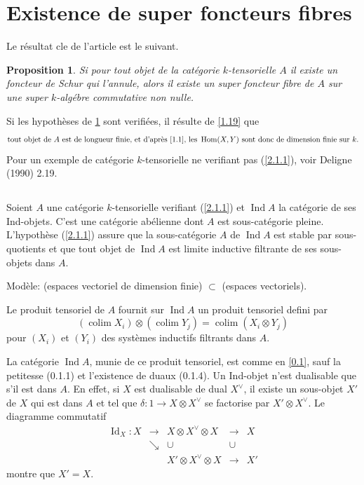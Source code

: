 \documentclass[11pt,a4paper]{article}
\theoremstyle{plain}
\newtheorem{proposition}[theorem]{Proposition}
\theoremstyle{definition}
\DeclareMathOperator{\Hom}{Hom}
\DeclareMathOperator{\Ind}{Ind}
\DeclareMathOperator{\Id}{Id}
\DeclareMathOperator*{\colim}{colim}
\begin{document}
\section{Existence de super foncteurs fibres}\label{2}

Le r\'esultat cle de l'article est le suivant.

\begin{proposition}\label{2.1}
Si pour tout objet de la cat\'egorie $k$-tensorielle $A$ il existe un foncteur de Schur qui l'annule, alors il existe un super foncteur fibre de $A$ sur une super $k$-alg\'ebre commutative non nulle.
\end{proposition}

Si les hypoth\`eses de \ref{2.1} sont verifi\'ees, il r\'esulte de \ref{1.19} que
\begin{equation}\label{2.1.1}
\text{tout objet de }A\text{ est de longueur finie, et d'apr\`es \ref{1.1}, les }\Hom(X,Y)\text{ sont donc de dimension finie sur }k.
\end{equation}
Pour un exemple de cat\'egorie $k$-tensorielle ne verifiant pas (\ref{2.1.1}), voir Deligne (1990) 2.19.

\subsection{}\label{2.2}

Soient $A$ une cat\'egorie $k$-tensorielle verifiant (\ref{2.1.1}) et $\Ind A$ la cat\'egorie de ses Ind-objets. C'est une cat\'egorie ab\'elienne dont $A$ est sous-cat\'egorie pleine. L'hypoth\`ese (\ref{2.1.1}) assure que la sous-cat\'egorie $A$ de $\Ind A$ est stable par sous-quotients et que tout objet de $\Ind A$ est limite inductive filtrante de ses sous-objets dans $A$.

Mod\`ele: (espaces vectoriel de dimension finie) $\subset$ (espaces vectoriels).

Le produit tensoriel de $A$ fournit sur $\Ind A$ un produit tensoriel defini par
\[
(\colim X_i)\otimes(\colim Y_j)=\colim(X_i\otimes Y_j)
\]
pour $(X_i)$ et $(Y_i)$ des syst\`emes inductifs filtrants dans $A$.

La cat\'egorie $\Ind A$, munie de ce produit tensoriel, est comme en \ref{0.1}, sauf la petitesse (0.1.1) et l'existence de duaux (0.1.4). Un Ind-objet n'est dualisable que s'il est dans $A$. En effet, si $X$ est dualisable de dual $X^\vee$, il existe un sous-objet $X'$ de $X$ qui est dans $A$ et tel que $\delta:1\to X\otimes X^\vee$ se factorise par $X'\otimes X^\vee$. Le diagramme commutatif
\[
\begin{matrix}
\Id_X:X & \longrightarrow & X\otimes X^\vee\otimes X & \longrightarrow & X\\
& \searrow & \cup & \cup\\
& & X'\otimes X^\vee\otimes X & \longrightarrow & X'
\end{matrix}
\]
montre que $X'=X$.
\end{document}
